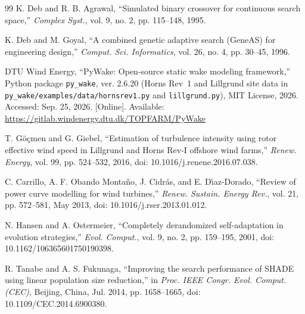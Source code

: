 {\begin{thebibliography}{99}
K. Deb and R. B. Agrawal, ``Simulated binary crossover for continuous search space,'' \textit{Complex Syst.}, vol. 9, no. 2, pp. 115--148, 1995.

K. Deb and M. Goyal, ``A combined genetic adaptive search (GeneAS) for engineering design,'' \textit{Comput. Sci. Informatics}, vol. 26, no. 4, pp. 30--45, 1996.

DTU Wind Energy, ``PyWake: Open-source static wake modeling framework,'' Python package \texttt{py\_wake}, ver. 2.6.20 (Horns Rev~1 and Lillgrund site data in \texttt{py\_wake/examples/data/hornsrev1.py} and \texttt{lillgrund.py}), MIT License, 2026. Accessed: Sep. 25, 2026. [Online]. Available: \url{https://gitlab.windenergy.dtu.dk/TOPFARM/PyWake}

T. G\"o\c{c}men and G. Giebel, ``Estimation of turbulence intensity using rotor effective wind speed in Lillgrund and Horns Rev-I offshore wind farms,'' \textit{Renew. Energy}, vol. 99, pp. 524--532, 2016, doi: 10.1016/j.renene.2016.07.038.

C. Carrillo, A. F. Obando Monta\~no, J. Cidr\'as, and E. D\'{\i}az-Dorado, ``Review of power curve modelling for wind turbines,'' \textit{Renew. Sustain. Energy Rev.}, vol. 21, pp. 572--581, May 2013, doi: 10.1016/j.rser.2013.01.012.

N. Hansen and A. Ostermeier, ``Completely derandomized self-adaptation in evolution strategies,'' \textit{Evol. Comput.}, vol. 9, no. 2, pp. 159--195, 2001, doi: 10.1162/106365601750190398.

R. Tanabe and A. S. Fukunaga, ``Improving the search performance of SHADE using linear population size reduction,'' in \textit{Proc. IEEE Congr. Evol. Comput. (CEC)}, Beijing, China, Jul. 2014, pp. 1658--1665, doi: 10.1109/CEC.2014.6900380.

\end{thebibliography}
}
